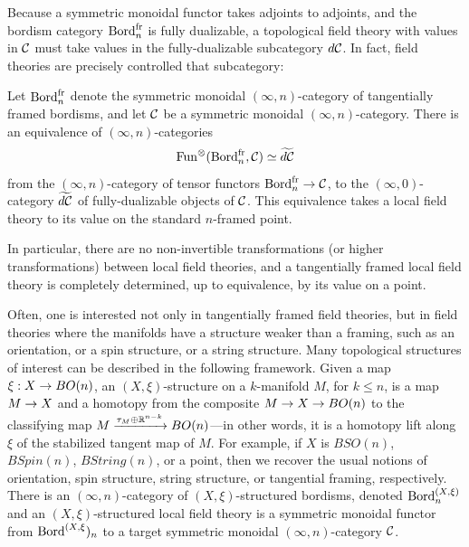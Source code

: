 \documentclass{amsart}
\begin{document}
Because a symmetric monoidal functor takes adjoints to adjoints, and the bordism category $\mathrm{Bord}^\mathrm{fr}_n$ is fully dualizable, a topological field theory with values in $\mathcal C$ must take values in the fully-dualizable subcategory $d\mathcal C$.  In fact, field theories are precisely controlled that subcategory:

\begin{apptheorem}
	Let $\mathrm{Bord}^\mathrm{fr}_n$ denote the symmetric monoidal $(\infty,n)$-category of tangentially framed bordisms, and let $\mathcal C$ be a symmetric monoidal $(\infty,n)$-category.  There is an equivalence of $(\infty,n)$-categories
	\begin{equation*}
		\operatorname{Fun}^\otimes(\mathrm{Bord}^\mathrm{fr}_n, \mathcal C) \simeq \widetilde{d\mathcal C}
	\end{equation*} 
from the $(\infty,n)$-category of tensor functors $\mathrm{Bord}^\mathrm{fr}_n \rightarrow \mathcal C$, to the $(\infty,0)$-category $\widetilde{d\mathcal C}$ of fully-dualizable objects of $\mathcal C$.  This equivalence takes a local field theory to its value on the standard $n$-framed point.	
\end{apptheorem}

\noindent In particular, there are no non-invertible transformations (or higher transformations) between local field theories, and a tangentially framed local field theory is completely determined, up to equivalence, by its value on a point.

Often, one is interested not only in tangentially framed field theories, but in field theories where the manifolds have a structure weaker than a framing, such as an orientation, or a spin structure, or a string structure.  Many topological structures of interest can be described in the following framework.  Given a map $\xi : X \rightarrow BO(n)$, an $(X,\xi)$-structure on a $k$-manifold $M$, for $k \leq n$, is a map $M \rightarrow X$ and a homotopy from the composite $M \rightarrow X \rightarrow BO(n)$ to the classifying map $M \xrightarrow{\tau_M \oplus \mathbb R^{n-k}} BO(n)$---in other words, it is a homotopy lift along $\xi$ of the stabilized tangent map of $M$.  For example, if $X$ is $BSO(n)$, $BSpin(n)$, $BString(n)$, or a point, then we recover the usual notions of orientation, spin structure, string structure, or tangential framing, respectively.  There is an $(\infty,n)$-category of $(X,\xi)$-structured bordisms, denoted $\mathrm{Bord}^{(X,\xi)}_n$ and an $(X,\xi)$-structured local field theory is a symmetric monoidal functor from $\mathrm{Bord}^{(X,\xi})_n$ to a target symmetric monoidal $(\infty,n)$-category $\mathcal C$.
\end{document}
